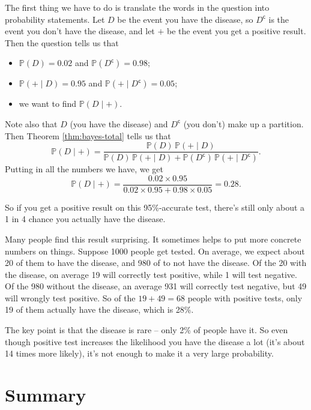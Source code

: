 \documentclass[
  a4paper,
]{book}
\providecommand{\tightlist}{%
  \setlength{\itemsep}{0pt}\setlength{\parskip}{0pt}}
\theoremstyle{definition}
\theoremstyle{definition}
\theoremstyle{definition}
\theoremstyle{definition}
\theoremstyle{remark}
\begin{document}
The first thing we have to do is translate the words in the question into probability statements. Let \(D\) be the event you have the disease, so \(D^\mathsf{c}\) is the event you don't have the disease, and let \(+\) be the event you get a positive result. Then the question tells us that

\begin{itemize}
\tightlist
\item
  \(\mathbb P(D) = 0.02\) and \(\mathbb P(D^\mathsf{c}) = 0.98\);
\item
  \(\mathbb P({+} \mid D) = 0.95\) and \(\mathbb P({+}\mid D^\mathsf{c}) = 0.05\);
\item
  we want to find \(\mathbb P(D \mid {+})\).
\end{itemize}

Note also that \(D\) (you have the disease) and \(D^\mathsf{c}\) (you don't) make up a partition. Then Theorem \ref{thm:bayes-total} tells us that
\[  \mathbb P(D \mid {+}) = \frac{\mathbb P(D) \,\mathbb P({+} \mid D)}{\mathbb P(D) \,\mathbb P({+} \mid D)+\mathbb P(D^\mathsf{c}) \,\mathbb P({+} \mid D^\mathsf{c})} . \]
Putting in all the numbers we have, we get
\[ \mathbb P(D \mid {+}) = \frac{0.02 \times 0.95}{0.02 \times 0.95 + 0.98 \times 0.05} = 0.28 .\]

So if you get a positive result on this 95\%-accurate test, there's still only about a 1 in 4 chance you actually have the disease.

Many people find this result surprising. It sometimes helps to put more concrete numbers on things. Suppose 1000 people get tested. On average, we expect about 20 of them to have the disease, and 980 of to not have the disease. Of the 20 with the disease, on average 19 will correctly test positive, while 1 will test negative. Of the 980 without the disease, an average 931 will correctly test negative, but 49 will wrongly test positive. So of the \(19+49 = 68\) people with positive tests, only 19 of them actually have the disease, which is 28\%.

The key point is that the disease is rare -- only 2\% of people have it. So even though positive test increases the likelihood you have the disease a lot (it's about 14 times more likely), it's not enough to make it a very large probability.

\hypertarget{summary-034}{%
\section*{Summary}\label{summary-034}}
\end{document}
